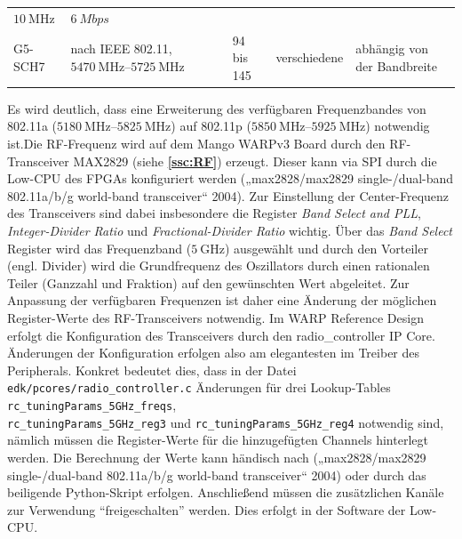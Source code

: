 \documentclass[letterpaper,11pt]{article}
\begin{document}
\begin{onehalfspace}
\begin{longtable}[]{@{}lllll@{}}
\begin{minipage}[t]{0.14\columnwidth}
\(\SI{10}{\mega\hertz}\)\strut
\end{minipage} & \begin{minipage}[t]{0.18\columnwidth}\raggedright\strut
\(\SI{6}{Mbps}\)\strut
\end{minipage}\tabularnewline
\begin{minipage}[t]{0.08\columnwidth}\raggedright\strut
G5-SCH7\strut
\end{minipage} & \begin{minipage}[t]{0.30\columnwidth}\raggedright\strut
nach IEEE 802.11, \(\SIrange{5470}{5725}{\mega\hertz}\)\strut
\end{minipage} & \begin{minipage}[t]{0.16\columnwidth}\raggedright\strut
94 bis 145\strut
\end{minipage} & \begin{minipage}[t]{0.14\columnwidth}\raggedright\strut
verschiedene\strut
\end{minipage} & \begin{minipage}[t]{0.18\columnwidth}\raggedright\strut
abhängig von der Bandbreite\strut
\end{minipage}\tabularnewline
\bottomrule
\end{longtable}

\noindent Es wird deutlich, dass eine Erweiterung des verfügbaren Frequenzbandes
von 802.11a (\(\SIrange{5180}{5825}{\mega\hertz}\)) auf 802.11p
(\(\SIrange{5850}{5925}{\mega\hertz}\)) notwendig ist.Die RF-Frequenz wird auf dem Mango WARPv3 Board durch den RF-Transceiver
MAX2829 (siehe \textbf{\autoref{ssc:RF}}) erzeugt. Dieser kann
via SPI durch die Low-CPU des FPGAs konfiguriert werden
(„max2828/max2829 single-/dual-band 802.11a/b/g world-band transceiver``
2004). Zur Einstellung der Center-Frequenz des Transceivers sind dabei
insbesondere die Register \emph{Band Select and PLL},
\emph{Integer-Divider Ratio} und \emph{Fractional-Divider Ratio}
wichtig. Über das \emph{Band Select} Register wird das Frequenzband
(\(\SI{5}{\giga\hertz}\)) ausgewählt und durch den Vorteiler (engl.
Divider) wird die Grundfrequenz des Oszillators durch einen rationalen
Teiler (Ganzzahl und Fraktion) auf den gewünschten Wert abgeleitet. Zur
Anpassung der verfügbaren Frequenzen ist daher eine Änderung der
möglichen Register-Werte des RF-Transceivers notwendig.
Im WARP Reference Design erfolgt die Konfiguration des Transceivers
durch den radio\_controller IP Core. Änderungen der Konfiguration
erfolgen also am elegantesten im Treiber des Peripherals. Konkret
bedeutet dies, dass in der Datei \texttt{edk/pcores/radio\_controller.c}
Änderungen für drei Lookup-Tables
\texttt{rc\_tuningParams\_5GHz\_freqs},\\
\texttt{rc\_tuningParams\_5GHz\_reg3} und
\texttt{rc\_tuningParams\_5GHz\_reg4} notwendig sind, nämlich müssen die
Register-Werte für die hinzugefügten Channels hinterlegt werden. Die
Berechnung der Werte kann händisch nach („max2828/max2829
single-/dual-band 802.11a/b/g world-band transceiver`` 2004) oder durch
das beiligende Python-Skript erfolgen.
Anschließend müssen die zusätzlichen Kanäle zur Verwendung
``freigeschalten'' werden. Dies erfolgt in der Software der Low-CPU.


\end{onehalfspace}
\end{document}
